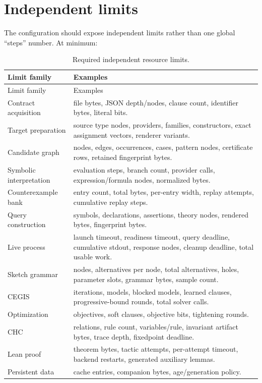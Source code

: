 \documentclass[11pt,oneside]{report}
\begin{document}
\section{Independent limits}

The configuration should expose independent limits rather than one global ``steps'' number. At minimum:

\begin{longtable}{@{}L{0.27\textwidth}L{0.67\textwidth}@{}}
\caption{Required independent resource limits.}\label{tab:limits}\\
\toprule
Limit family & Examples \\
\midrule
\endfirsthead
\toprule
Limit family & Examples \\
\midrule
\endhead
\bottomrule
\endfoot
Contract acquisition & file bytes, JSON depth/nodes, clause count, identifier bytes, literal bits. \\
Target preparation & source type nodes, providers, families, constructors, exact assignment vectors, renderer variants. \\
Candidate graph & nodes, edges, occurrences, cases, pattern nodes, certificate rows, retained fingerprint bytes. \\
Symbolic interpretation & evaluation steps, branch count, provider calls, expression/formula nodes, normalized bytes. \\
Counterexample bank & entry count, total bytes, per-entry width, replay attempts, cumulative replay steps. \\
Query construction & symbols, declarations, assertions, theory nodes, rendered bytes, fingerprint bytes. \\
Live process & launch timeout, readiness timeout, query deadline, cumulative stdout, response nodes, cleanup deadline, total usable work. \\
Sketch grammar & nodes, alternatives per node, total alternatives, holes, parameter slots, grammar bytes, sample count. \\
CEGIS & iterations, models, blocked models, learned clauses, progressive-bound rounds, total solver calls. \\
Optimization & objectives, soft clauses, objective bits, tightening rounds. \\
CHC & relations, rule count, variables/rule, invariant artifact bytes, trace depth, fixedpoint deadline. \\
Lean proof & theorem bytes, tactic attempts, per-attempt timeout, backend restarts, generated auxiliary lemmas. \\
Persistent data & cache entries, companion bytes, age/generation policy. \\
\end{longtable}
\end{document}
